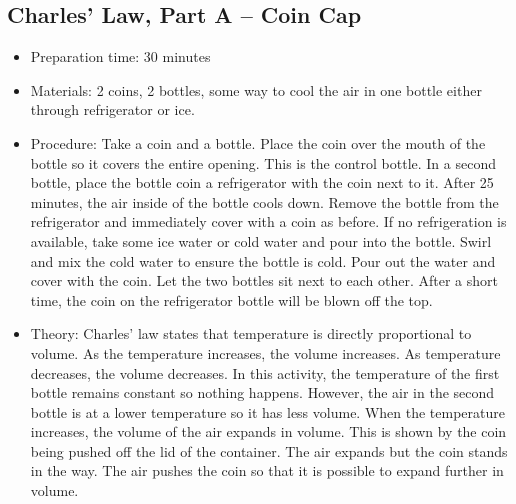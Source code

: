 \subsection{Charles' Law, Part A -- Coin Cap}
\begin{itemize}
\item{Preparation time: 30 minutes}
\item{Materials: 2 coins, 2 bottles, some way to cool the air in one bottle either through refrigerator or ice.}
\item{Procedure: Take a coin and a bottle. Place the coin over the mouth of the bottle so it covers the entire opening. This is the control bottle. In a second bottle, place the bottle coin a refrigerator with the coin next to it. After 25 minutes, the air inside of the bottle cools down. Remove the bottle from the refrigerator and immediately cover with a coin as before. If no refrigeration is available, take some ice water or cold water and pour into the bottle. Swirl and mix the cold water to ensure the bottle is cold. Pour out the water and cover with the coin. Let the two bottles sit next to each other. After a short time, the coin on the refrigerator bottle will be blown off the top.}
\item{Theory: Charles' law states that temperature is directly proportional to volume. As the temperature increases, the volume increases. As temperature decreases, the volume decreases. In this activity, the temperature of the first bottle remains constant so nothing happens. However, the air in the second bottle is at a lower temperature so it has less volume. When the temperature increases, the volume of the air expands in volume. This is shown by the coin being pushed off the lid of the container. The air expands but the coin stands in the way. The air pushes the coin so that it is possible to expand further in volume.}
\end{itemize}

